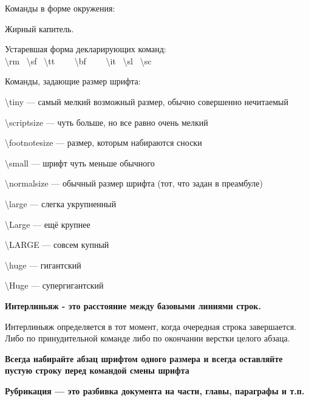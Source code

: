 \noindent
Команды в форме окружения:

\begin{bfseries}
    \begin{scshape}
        \noindent
        Жирный капитель.
    \end{scshape}
\end{bfseries}
\medskip

\noindent
Устаревшая форма декларирующих команд:\\
\textbackslash rm \
\textbackslash sf \
\textbackslash tt \ \ \ \
\textbackslash bf \ \ \ \
\textbackslash it \
\textbackslash sl \
\textbackslash sc
\medskip

\noindent
Команды, задающие размер шрифта:

\noindent
{\tiny \textbackslash tiny --- самый мелкий возможный размер, обычно совершенно нечитаемый}
\medskip

\noindent
{\scriptsize \textbackslash scriptsize --- чуть больше, но все равно очень мелкий}
\medskip

\noindent
{\footnotesize \textbackslash footnotesize --- размер, которым набираются сноски}
\medskip

\noindent
{\small \textbackslash small --- шрифт чуть меньше обычного}
\medskip

\noindent
{\normalsize \textbackslash normalsize --- обычный размер шрифта (тот, что задан в преамбуле)}
\medskip

\noindent
{\large \textbackslash large --- слегка укрупненный}
\medskip

\noindent
{\Large \textbackslash Large --- ещё крупнее}
\medskip

\noindent
{\LARGE \textbackslash LARGE --- совсем купный}
\medskip

\noindent
{\huge \textbackslash huge --- гигантский}
\medskip

\noindent
{\Huge \textbackslash Huge --- супергигантский}
\medskip

\noindent
\textbf{Интерлиньяж - это расстояние между базовыми линиями строк.}
\medskip

\noindent
Интерлиньяж определяется в тот момент, когда очередная строка завершается. Либо по принудительной команде либо по окончании верстки целого абзаца.
\medskip

\noindent
\textbf{Всегда набирайте абзац шрифтом одного размера и всегда оставляйте пустую строку перед командой смены шрифта}

\clearpage

\noindent
\textbf{
Рубрикация --- это разбивка документа на части, главы, параграфы и т.п.}
\medskip


